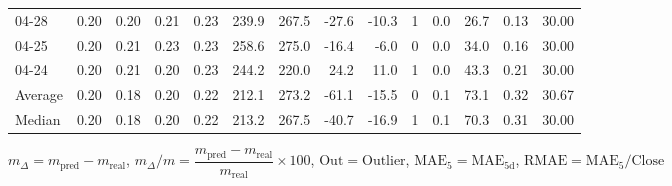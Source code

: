 \begin{threeparttable}
{\begin{tabular}{lrrrrrrrrrrrrr}
  04-28 &          0.20 &          0.20 &          0.21 &        0.23 &               239.9 &               267.5 &      -27.6 &        -10.3 &              1 &                 0.0 &             26.7 &            0.13 &                  30.00 \\
  04-25 &          0.20 &          0.21 &          0.23 &        0.23 &               258.6 &               275.0 &      -16.4 &         -6.0 &              0 &                 0.0 &             34.0 &            0.16 &                  30.00 \\
  04-24 &          0.20 &          0.21 &          0.20 &        0.23 &               244.2 &               220.0 &       24.2 &         11.0 &              1 &                 0.0 &             43.3 &            0.21 &                  30.00 \\
Average &          0.20 &          0.18 &          0.20 &        0.22 &               212.1 &               273.2 &      -61.1 &        -15.5 &              0 &                 0.1 &             73.1 &            0.32 &                  30.67 \\
 Median &          0.20 &          0.18 &          0.20 &        0.22 &               213.2 &               267.5 &      -40.7 &        -16.9 &              1 &                 0.1 &             70.3 &            0.31 &                  30.00 \\
\bottomrule
\end{tabular}
}
\begin{tablenotes}\footnotesize
\item $m_\Delta=m_{\text{pred}}-m_{\text{real}}$,
$m_\Delta/m=\dfrac{m_{\text{pred}}-m_{\text{real}}}{m_{\text{real}}}\times100$,
$\mathrm{Out}=\text{Outlier}$,
$\mathrm{MAE}_5=\mathrm{MAE}_{5\text{d}}$,
$\mathrm{RMAE}=\mathrm{MAE}_5/\text{Close}$
\end{tablenotes}
\end{threeparttable}
\endgroup

